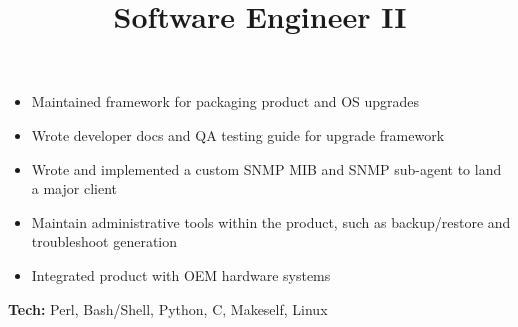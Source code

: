 
        \title{Software Engineer II}
        \begin{position}
        	\vspace{-12pt}\begin{itemize}
				\item Maintained framework for packaging product and OS upgrades
				\item Wrote developer docs and QA testing guide for upgrade framework
	            \item Wrote and implemented a custom SNMP MIB and SNMP sub-agent to land a major client
				\item Maintain administrative tools within the product, such as backup/restore and troubleshoot generation
				\item Integrated product with OEM hardware systems
			\end{itemize}
			\textbf{Tech:} Perl, Bash/Shell, Python, C, Makeself, Linux
        \end{position}       
        
